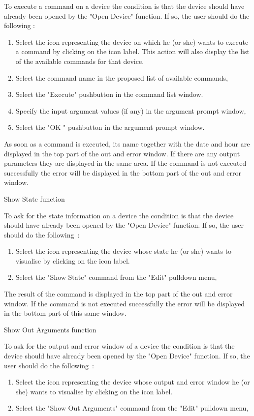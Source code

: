 To execute a command on a device the condition is that the device should have
already been opened by the "Open Device" function. If so, the user should do the
following :
\begin{enumerate}
\item
Select the icon representing the device on which he (or she) wants to execute
a command by clicking on the icon label. This action will also display the 
list of the available commands for that device.
\item
Select the command name in the proposed list of available commands,
\item
Select the "Execute" pushbutton in the command list window.
\item
Specify the input argument values (if any) in the argument prompt window,
\item
Select the "OK " pushbutton in the argument prompt window.
\end{enumerate}

As soon as a command is executed, its name together with the date and hour are
displayed in the top part of the out and error window. If there are any output
parameters they are displayed in the same area.
If the command is not executed successfully the error will be displayed in the 
bottom part of the out and error window.


	{Show State function}

To ask for the state information on a device the condition is that the device
should have already been opened by the "Open Device" function. If so, the user
should do the following~:
\begin{enumerate}
\item
Select the icon representing the device whose state he (or she) wants to
visualise by clicking on the icon label.
\item
Select the "Show State" command from the "Edit" pulldown menu,
\end{enumerate}

The result of the command is displayed in the top part of the out and error 
window.
If the command is not executed successfully the error will be displayed in the 
bottom part of this same window. 


  {Show Out Arguments function}

To ask for the output and error window of a device the condition is that the 
device should have already been opened by the "Open Device" function. If so, 
the user should do the following~:
\begin{enumerate}
\item
Select the icon representing the device whose output and error window he (or 
she) wants to visualise by clicking on the icon label.
\item
Select the "Show Out Arguments" command from the "Edit" pulldown menu,
\end{enumerate}

